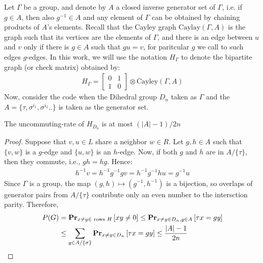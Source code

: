 \documentclass[manuscript,screen,review]{acmart}
\begin{document}
Let $\Gamma$ be a group, and denote by $A$ a closed inverse generator set of $\Gamma$, i.e. if $g \in A$, then also $g^{-1} \in A$ and any element of $\Gamma$ can be obtained by chaining products of $A$'s elements. Recall that the Cayley graph $\text{Caylay}(\Gamma, A)$ is the graph such that its vertices are the elements of $\Gamma$, and there is an edge between $u$ and $v$ only if there is $g \in A$ such that $gu = v$, for paritcular $g$ we call to such edges $g$-edges. In this work, we will use the notation $H_{\Gamma}$ to denote the bipartite graph (or check matrix) obtained by:
\begin{equation*}
  \begin{split}
    H_{\Gamma} = \begin{bmatrix}
      0 & 1 \\
      1 & 0
    \end{bmatrix} \otimes \text{Cayley} \left( \Gamma, A \right)
  \end{split}
\end{equation*}
Now, consider the code when the Dihedral group $D_n$ taken as $\Gamma$ and the $A = \{ \tau, \sigma^{i_{1}}, \sigma^{i_2} .. \}$ is taken as the generator set. 
\begin{claim}
  The uncommuting-rate of $H_{D_{n}}$ is at most $(|A|-1)/2n $
\end{claim}
\begin{proof}
Suppose that $v,u \in L$ share a neighbor $w\in R$. Let $g,h \in A$ such that $\{v,w\}$ is a $g$-edge and $\{u,w\}$ is an $h$-edge. Now, if both $g$ and $h$ are in $A/\{\tau\}$, then they commute, i.e., $gh=hg$. Hence:
  \begin{equation*}
    \begin{split}
      h^{-1}v = h^{-1}g^{-1}gv = h^{-1}g^{-1}hu =g^{-1}u
    \end{split}
  \end{equation*}
Since $\Gamma$ is a group, the map $(g,h) \mapsto (g^{-1},h^{-1})$ is a bijection, so overlaps of generator pairs from $A/\{\tau\}$ contribute only an even number to the intersction parity. Therefore, 
  \begin{equation*}
    \begin{split}
      P(G) & =  \prbm{ xy \neq 0 }{x\neq y \in \text{ rows } H } \le  \prbm{\tau x = gy }{x\neq y \in D_{n}, g\in A } \\ 
      & \le \sum_{g \in A / \{ \sigma \} }{ \prbm{\tau x = gy }{x\neq y \in D_{n} }}\le \frac{|A|-1}{2n} 
    \end{split}
  \end{equation*}
\end{proof}
\end{document}
